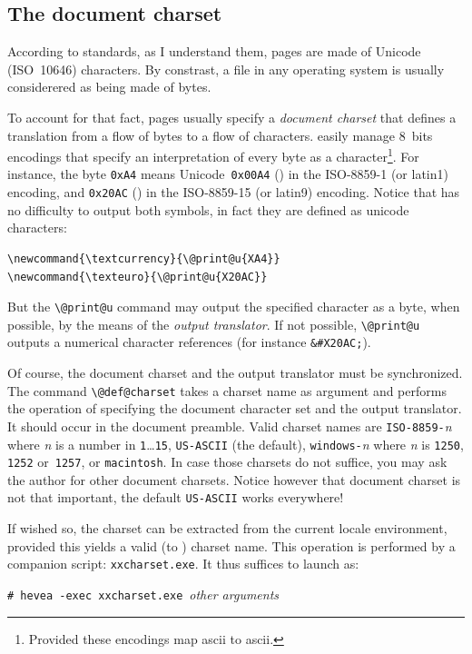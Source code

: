 \subsection{The \label{encodings}document charset}
According to standards, as I understand them, \html{} pages are
made of Unicode (ISO~10646) characters.
By constrast, a file in any operating system is usually considerered as
being made of bytes.

%
To account for that fact, \html{} pages usually specify a \emph{document
charset} that defines a translation from a flow of bytes to a flow of
characters. \hevea{} easily manage 8~bits encodings that specify an
interpretation of every byte as a character\footnote{Provided these
encodings map ascii to ascii.}.
For instance, the byte
\texttt{0xA4} means Unicode~\texttt{0x00A4} (\textcurrency) in the
ISO-8859-1 (or latin1) encoding, and \texttt{0x20AC} (\texteuro) in
the ISO-8859-15 (or latin9) encoding.
Notice that \hevea{} has no difficulty to output both symbols, in fact
they are defined as unicode characters:
\begin{verbatim}
\newcommand{\textcurrency}{\@print@u{XA4}}
\newcommand{\texteuro}{\@print@u{X20AC}}
\end{verbatim}
But the \verb+\@print@u+ command may output the specified character as
a byte, when possible, by the means of the \emph{output translator}.
If not possible, \verb+\@print@u+ outputs a numerical character
references (for instance \verb+&#X20AC;+).

%
Of course, the document charset and the output translator
must be synchronized. The command \verb+\@def@charset+ takes a
charset name as argument and performs the operation of specifying the
document character set and the output translator. It should occur in
the document preamble.
Valid  charset names are \texttt{ISO-8859-}\textit{n} where \textit{n} is a
number in \texttt{1}\ldots\texttt{15}, \texttt{US-ASCII} (the
default),
\texttt{windows-}\textit{n} where \textit{n} is
\texttt{1250}, \texttt{1252} or~\texttt{1257},
or \texttt{macintosh}.
In case those charsets do not suffice, you may ask the author for
other document charsets.  Notice however that document charset is not
that important, the default \texttt{US-ASCII} works everywhere!


%
If wished so, the charset can be extracted from the current
locale environment, provided this yields a valid (to \hevea) charset name.
This operation is performed by a companion script: \texttt{xxcharset.exe}.
It thus suffices to launch \hevea{} as:
\begin{flushleft}
\texttt{\# hevea -exec xxcharset.exe}~\textit{other arguments} 
\end{flushleft}

